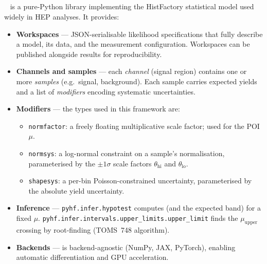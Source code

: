 \subsection{\pyhf{}}

\pyhf{}~\cite{pyhf,pyhf_joss} is a pure-Python library implementing the
HistFactory statistical model used widely in HEP analyses.  It provides:
%
\begin{itemize}
  \item \textbf{Workspaces} — JSON-serialisable likelihood specifications
    that fully describe a model, its data, and the measurement configuration.
    Workspaces can be published alongside results for reproducibility.

  \item \textbf{Channels and samples} — each \emph{channel} (signal region)
    contains one or more \emph{samples} (e.g.\ signal, background).  Each
    sample carries expected yields and a list of \emph{modifiers} encoding
    systematic uncertainties.

  \item \textbf{Modifiers} — the types used in this framework are:
    \begin{itemize}
      \item \texttt{normfactor}: a freely floating multiplicative scale
        factor; used for the POI $\mu$.
      \item \texttt{normsys}: a log-normal constraint on a sample's
        normalisation, parameterised by the $\pm1\sigma$ scale factors
        $\theta_\text{hi}$ and $\theta_\text{lo}$.
      \item \texttt{shapesys}: a per-bin Poisson-constrained uncertainty,
        parameterised by the absolute yield uncertainty.
    \end{itemize}

  \item \textbf{Inference} — \texttt{pyhf.infer.hypotest} computes \CLs{}
    (and the expected band) for a fixed $\mu$.
    \texttt{pyhf.infer.intervals.upper\_limits.upper\_limit} finds the
    $\mu_\text{upper}$ crossing by root-finding (TOMS~748 algorithm).

  \item \textbf{Backends} — \pyhf{} is backend-agnostic (NumPy, JAX,
    PyTorch), enabling automatic differentiation and GPU acceleration.
\end{itemize}

